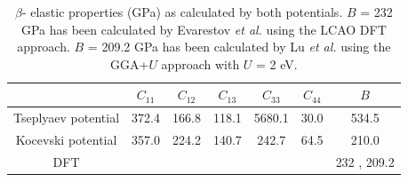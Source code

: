 \documentclass[preprint, 12pt]{elsarticle}
\begin{document}
\begin{table}[h!]
    \centering
    \caption{$\beta$- elastic properties (GPa) as calculated by both potentials. $B$ = 232 GPa has been calculated by Evarestov \textit{et al.} \cite{Evarestov2008} using the LCAO DFT approach. $B$ = 209.2 GPa has been calculated by Lu \textit{et al.} \cite{Lu2011} using the GGA+$U$ approach with $U$ = 2 eV.}
    \footnotesize
    \begin{tabular}{c|ccccc|c}
    \hline
                  & $C_{11}$ & $C_{12}$ & $C_{13}$ & $C_{33}$ & $C_{44}$ & $B$ \\
    \hline
    Tseplyaev potential           & 372.4    & 166.8    & 118.1    & 5680.1   & 30.0     & 534.5 \\
    
    Kocevski potential & 357.0    & 224.2    & 140.7    & 242.7    & 64.5     & 210.0 \\
    
    DFT           &          &          &          &          &          & 232 \cite{Evarestov2008}, 209.2 \cite{Lu2011} \\
    \hline
    \end{tabular}
    \label{Tab:ECU2N3}
\end{table}
\end{document}
